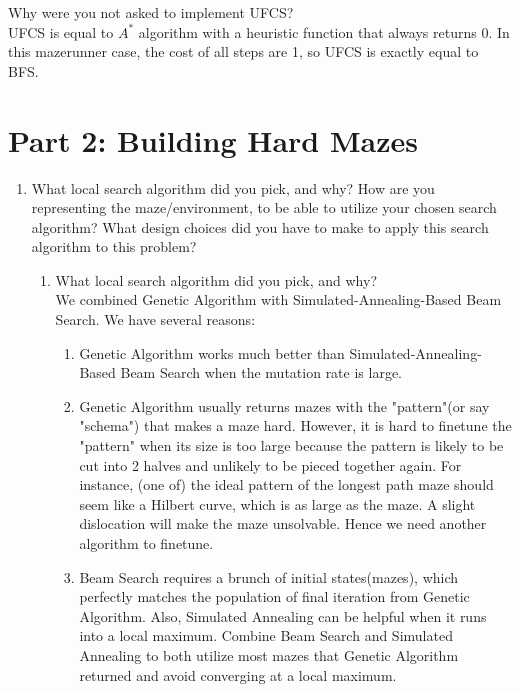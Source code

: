 \documentclass[letter]{article}
\begin{document}
\begin{bonus}
	\item {Why were you not asked to implement UFCS?} \\
	UFCS is equal to $ A^* $ algorithm with a heuristic function that always returns 0. In this mazerunner case, the cost of all steps are 1, so UFCS is exactly equal to BFS.
\end{bonus}

\section{Part 2: Building Hard Mazes}
	\label{sec:Part 2: Building Hard Mazes}
	\begin{enumerate}[resume]
		
		\item {What local search algorithm did you pick, and why? How are you representing the maze/environment, to be able to utilize your chosen search algorithm? What design choices did you have to make to apply this search algorithm to this problem?}
		
		\begin{enumerate}
			\item {What local search algorithm did you pick, and why?} \\
			We combined Genetic Algorithm with Simulated-Annealing-Based Beam Search. We have several reasons: \\
			\begin{enumerate}
				\item {Genetic Algorithm works much better than Simulated-Annealing-Based Beam Search when the mutation rate is large.} \\
				
				\item {Genetic Algorithm usually returns mazes with the "pattern"(or say "schema") that makes a maze hard. However, it is hard to finetune the "pattern" when its size is too large because the pattern is likely to be cut into 2 halves and unlikely to be pieced together again. For instance, (one of) the ideal pattern of the longest path maze should seem like a Hilbert curve, which is as large as the maze. A slight dislocation will make the maze unsolvable. Hence we need another algorithm to finetune.} \\
				
				\item {Beam Search requires a brunch of initial states(mazes), which perfectly matches the population of final iteration from Genetic Algorithm. Also, Simulated Annealing can be helpful when it runs into a local maximum. Combine Beam Search and Simulated Annealing to both utilize most mazes that Genetic Algorithm returned and avoid converging at a local maximum.}
			\end{enumerate}
			

\end{enumerate}
\end{enumerate}
\end{document}
